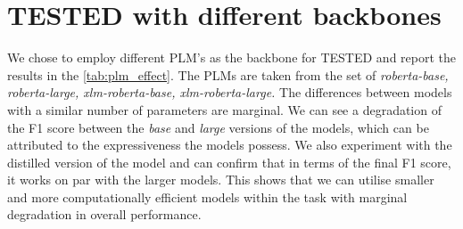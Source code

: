 \documentclass[11pt]{article}
\begin{document}
\section{TESTED with different backbones}
\label{sec:transformers}

We chose to employ different PLM's as the backbone for TESTED and report the results in the \autoref{tab:plm_effect}. The PLMs are taken from the set of \textit{roberta-base, roberta-large, xlm-roberta-base, xlm-roberta-large. }The differences between models with a similar number of parameters are marginal. We can see a degradation of the F1 score between the \textit{base} and \textit{large}  versions of the models, which can be attributed to the expressiveness the models possess. We also experiment with the distilled version of the model and can confirm that in terms of the final F1 score, it works on par with the larger models. This shows that we can utilise smaller and more computationally efficient models within the task with marginal degradation in overall performance.
\end{document}
